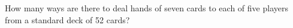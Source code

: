 \documentclass[../main.tex]{subfiles}
\begin{document}
How many ways are there to deal hands of seven cards to each of five players from a standard deck of 52 cards?

\solution
\end{document}
